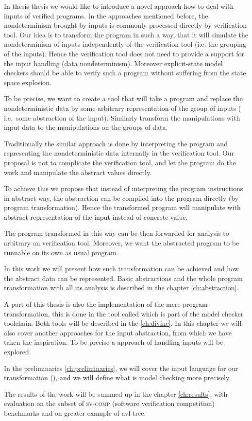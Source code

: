 In thesis thesis we would like to introduce a novel approach how to deal with
inputs of verified programs. In the approaches mentioned before, the
nondeterminism brought by inputs is commonly processed directly by verification
tool. Our idea is to transform the program in such a way, that it will simulate
the nondeterminism of inputs independently of the verification tool (i.e. the
grouping of the inputs). Hence the verification tool does not need to
provide a support for the input handling (data nondeterminism). Moreover
explicit-state model checkers should be able to verify such a program without
suffering from the state space explosion.

To be precise, we want to create a tool that will take a program and replace the
nondeterministic data by some arbitrary representation of the group of inputs (
i.e.~some abstraction of the input).
Similarly transform the manipulations with input data to the manipulations
on the groups of data.

Traditionally the similar approach is done by interpreting the program and
representing the nondeterministic data internally in the verification tool.
Our proposal is not to complicate the verification tool, and let the program do
the work and manipulate the abstract values directly.

To achieve this we propose that instead of interpreting the program
instructions in abstract way, the abstraction can be compiled into the program
directly (by program transformation). Hence the transformed program will
manipulate with abstract representation of the input instead of concrete value.

The program transformed in this way can be then forwarded for analysis to
arbitrary an verification tool. Moreover, we want the abstracted program to be
runnable on its own as usual program.

In this work we will present how such transformation can be achieved and how
the abstract data can be represented. Basic abstractions and the whole program
transformation with all its analysis is described in the chapter \ref{ch:abstraction}.

A part of this thesis is also the implementation of the mere program
transformation, this is done in the tool called \LART which is part of the
\DIVINE model checker toolchain. Both tools will be described in the
\autoref{ch:divine}. In this chapter we will also cover another approaches for the
input abstraction, from which we have taken the inspiration. To be precise a
\SymDIVINE approach of handling inputs will be explored.

In the preliminaries \autoref{ch:preliminaries}, we will cover the input
language for our transformation (\LLVM), and we will define what is model
checking more precisely.

The results of the work will be summed up in the chapter \autoref{ch:results},
with evaluation on the subset of \textsc{sv-comp} (software verification
competition) benchmarks and on greater example of avl tree.

